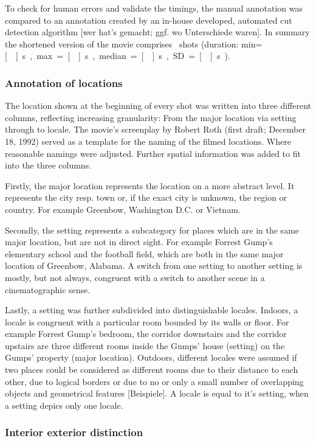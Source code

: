 \documentclass[10pt,a4paper,twocolumn]{article}
\begin{document}
To check for human errors and validate the timings, the manual annotation was
compared to an annotation created by an in-house developed, automated cut
detection algorithm {[}wer hat's gemacht; ggf. wo Unterschiede waren{]}. In
summary the shortened version of the movie comprises \NShots\ shots (duration:
min=\unit[\ShotLengthMin]{s}, max=\unit[\ShotLengthMax]{s},
median=\unit[\ShotLengthMedian]{s}, SD=\unit[\ShotLengthSD]{s}).


\subsubsection{Annotation of locations}

The location shown at the beginning of every shot was written into
three different columns, reflecting increasing granularity: From the
major location via setting through to locale. The movie's screenplay
by Robert Roth (first draft; December 18, 1992) served as a template
for the naming of the filmed locations. Where reasonable namings were
adjusted. Further spatial information was added to fit into the three
columns.

Firstly, the major location represents the location on a more abstract
level. It represents the city resp. town or, if the exact city is
unknown, the region or country. For example Greenbow, Washington D.C.
or Vietnam. 

Secondly, the setting represents a subcategory for places which are
in the same major location, but are not in direct sight. For example
Forrest Gump's elementary school and the football field, which are
both in the same major location of Greenbow, Alabama. A switch from
one setting to another setting is mostly, but not always, congruent
with a switch to another scene in a cinematographic sense.

Lastly, a setting was further subdivided into distinguishable locales.
Indoors, a locale is congruent with a particular room bounded by its
walls or floor. For example Forrest Gump's bedroom, the corridor downstairs
and the corridor upstairs are three different rooms inside the Gumps'
house (setting) on the Gumps' property (major location). Outdoors,
different locales were assumed if two places could be considered as
different rooms due to their distance to each other, due to logical
borders or due to no or only a small number of overlapping objects
and geometrical features {[}Beispiele{]}. A locale is equal to it's
setting, when a setting depics only one locale. 


\subsubsection{Interior exterior distinction }
\end{document}
